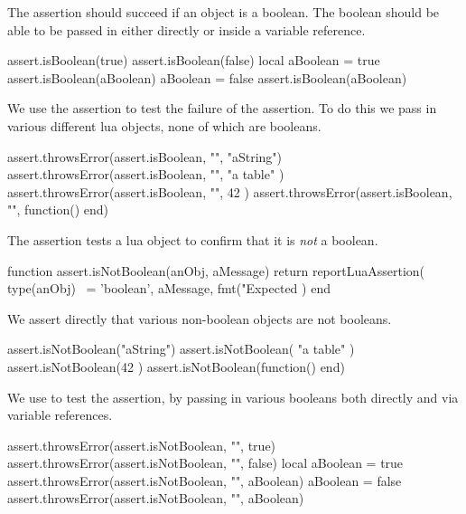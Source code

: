 
The  assertion should succeed if an object is a 
boolean. The boolean should be able to be passed in either directly or 
inside a variable reference. 

\startLuaTest
  assert.isBoolean(true)
  assert.isBoolean(false)
  local aBoolean = true
  assert.isBoolean(aBoolean)
  aBoolean = false
  assert.isBoolean(aBoolean)
\stopLuaTest
\stopTestCase


We use the  assertion to test the failure of the 
 assertion. To do this we pass in various different 
lua objects, none of which are booleans. 

\startLuaTest
  assert.throwsError(assert.isBoolean, "", "aString")
  assert.throwsError(assert.isBoolean, "", { "a table" })
  assert.throwsError(assert.isBoolean, "", 42 )
  assert.throwsError(assert.isBoolean, "", function() end)
\stopLuaTest
\stopTestCase

\stopTestSuite


The  assertion tests a lua object to confirm 
that it is \emph{not} a boolean. 

\startLuaCode
function assert.isNotBoolean(anObj, aMessage)
  return reportLuaAssertion(
    type(anObj) ~= 'boolean',
    aMessage,
    fmt("Expected %
  )
end
\stopLuaCode


We assert directly that various non-boolean objects are not booleans. 

\startLuaTest
  assert.isNotBoolean("aString")
  assert.isNotBoolean({ "a table" })
  assert.isNotBoolean(42 )
  assert.isNotBoolean(function() end)
\stopLuaTest
\stopTestCase


We use  to test the  
assertion, by passing in various booleans both directly and via variable 
references. 

\startLuaTest
  assert.throwsError(assert.isNotBoolean, "", true)
  assert.throwsError(assert.isNotBoolean, "", false)
  local aBoolean = true
  assert.throwsError(assert.isNotBoolean, "", aBoolean)
  aBoolean = false
  assert.throwsError(assert.isNotBoolean, "", aBoolean)
\stopLuaTest
\stopTestCase

